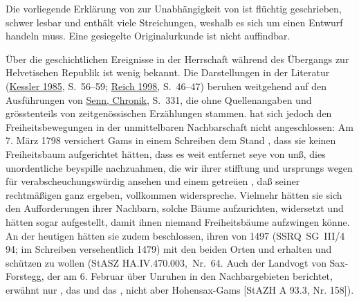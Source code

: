 \documentclass[10pt,twoside]{article}
\begin{document}
\begin{introlist}

         \item {
            Die vorliegende Erklärung von  zur Unabhängigkeit
               von  ist flüchtig geschrieben, schwer
               lesbar und enthält viele Streichungen, weshalb es sich um einen Entwurf handeln muss. Eine
               gesiegelte Originalurkunde ist nicht auffindbar.
               


}
         \item {
            Über die geschichtlichen Ereignisse in der Herrschaft  während des Übergangs zur Helvetischen Republik ist
               wenig bekannt. Die Darstellungen in der Literatur (\href{http://permalink.snl.ch/bib/chbsg000081018}{Kessler 1985},
                  S. 56–59; \href{http://permalink.snl.ch/bib/chbsg000141030}{Reich
                     1998}, S. 46–47) beruhen weitgehend auf den Ausführungen von
                     \href{http://permalink.snl.ch/bib/chbsg000113555}{Senn, Chronik},
                     S. 331, die ohne Quellenangaben und grösstenteils von
               zeitgenössischen Erzählungen stammen.  hat
               sich jedoch den Freiheitsbewegungen in der unmittelbaren Nachbarschaft nicht
               angeschlossen: Am 7. März 1798 versichert Gams in
               einem Schreiben dem Stand , dass sie keinen
               Freiheitsbaum aufgerichtet hätten, dass es \textup{weit entfernet seye von unß, dies
                  unordentliche beyspille nachzuahmen, die wir ihrer stifftung und ursprungs wegen
                  für verabscheuchungswürdig ansehen und einem getreüen , daß seiner rechtmäßigen 
                  ganz ergeben}, vollkommen widerspreche. Vielmehr hätten sie sich den
               Aufforderungen ihrer Nachbarn, solche Bäume aufzurichten, widersetzt und hätten sogar
                   aufgestellt, damit ihnen niemand
               Freiheitsbäume aufzwingen könne. An der heutigen  hätten sie zudem beschlossen, ihren  von 1497 (SSRQ~SG~III/4 94;
               im Schreiben versehentlich 1479) mit den beiden Orten  und  erhalten und
               schützen zu wollen (StASZ
               HA.IV.470.003, Nr. 64. Auch der Landvogt von Sax-Forstegg, der am 6. Februar über Unruhen in den Nachbargebieten berichtet, erwähnt nur , das  und das , nicht aber Hohensax-Gams [StAZH A 93.3, Nr. 158]).


}
\end{introlist}
\end{document}

